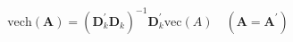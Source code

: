 \begin{equation}
    \mathrm{vech}
    \left(
    \mathbf{A}
    \right)
    =
    \left(
    \mathbf{D}_{k}^{\prime}
    \mathbf{D}_{k}
    \right)^{-1}
    \mathbf{D}_{k}^{\prime}
    \mathrm{vec}
    \left(
    A
    \right)
    \quad
    \left(
    \mathbf{A} = \mathbf{A}^{\prime}
    \right)
    \label{eq:linearAlgebra-vech-and-dcap}
\end{equation}
